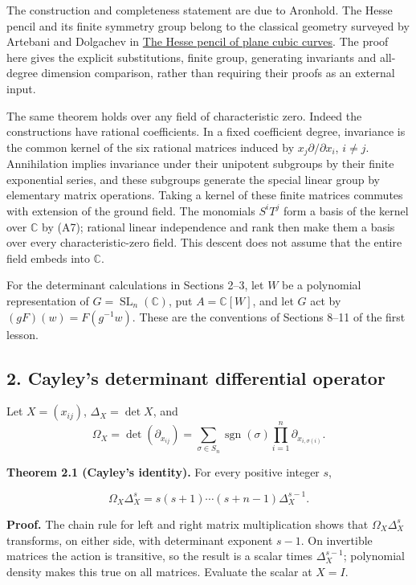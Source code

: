 \documentclass[
]{article}
\begin{document}
The construction and completeness statement are due to Aronhold. The
Hesse pencil and its finite symmetry group belong to the classical
geometry surveyed by Artebani and Dolgachev in
\href{https://arxiv.org/abs/math/0611590}{The Hesse pencil of plane
cubic curves}. The proof here gives the explicit substitutions, finite
group, generating invariants and all-degree dimension comparison, rather
than requiring their proofs as an external input.

The same theorem holds over any field of characteristic zero. Indeed the
constructions have rational coefficients. In a fixed coefficient degree,
invariance is the common kernel of the six rational matrices induced by
\(x_j\partial/\partial x_i\), \(i\ne j\). Annihilation implies
invariance under their unipotent subgroups by their finite exponential
series, and these subgroups generate the special linear group by
elementary matrix operations. Taking a kernel of these finite matrices
commutes with extension of the ground field. The monomials \(S^iT^j\)
form a basis of the kernel over \(\mathbb C\) by (A7); rational linear
independence and rank then make them a basis over every
characteristic-zero field. This descent does not assume that the entire
field embeds into \(\mathbb C\).

For the determinant calculations in Sections 2--3, let \(W\) be a
polynomial representation of \(G=\operatorname{SL}_n(\mathbb C)\), put
\(A=\mathbb C[W]\), and let \(G\) act by \((gF)(w)=F(g^{-1}w)\). These
are the conventions of Sections 8--11 of the first lesson.

\subsection{2. Cayley's determinant differential
operator}\label{section-2}

Let \(X=(x_{ij})\), \(\Delta_X=\det X\), and \[
\Omega_X=\det(\partial_{x_{ij}})
=\sum_{\sigma\in S_n}\operatorname{sgn}(\sigma)
\prod_{i=1}^n\partial_{x_{i,\sigma(i)}}.
\]

\protect{}\label{theorem-2-1}{}

\textbf{Theorem 2.1 (Cayley's identity).} For every positive integer
\(s\), \protect{}\label{equation-H5}{}

\[
\Omega_X\Delta_X^s
=s(s+1)\cdots(s+n-1)\Delta_X^{s-1}.
\tag{H5}
\]

\textbf{Proof.} The chain rule for left and right matrix multiplication
shows that \(\Omega_X\Delta_X^s\) transforms, on either side, with
determinant exponent \(s-1\). On invertible matrices the action is
transitive, so the result is a scalar times \(\Delta_X^{s-1}\);
polynomial density makes this true on all matrices. Evaluate the scalar
at \(X=I\).
\end{document}
